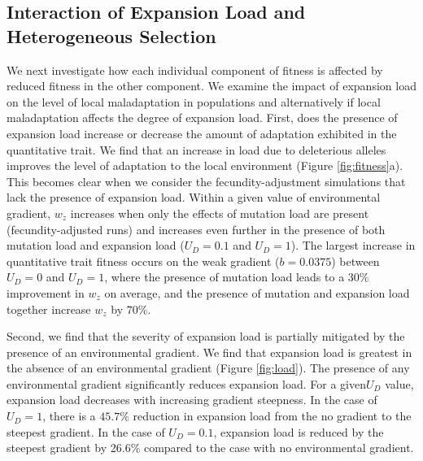 \subsection*{Interaction of Expansion Load and Heterogeneous Selection}
We next investigate how each individual component of fitness is affected by reduced fitness in the other component. We examine the impact of expansion load on the level of local maladaptation in populations and alternatively if local maladaptation affects the degree of expansion load. First, does the presence of expansion load increase or decrease the amount of adaptation exhibited in the quantitative trait. We find that an increase in load due to deleterious alleles improves the level of adaptation to the local environment (Figure \ref{fig:fitness}a). This becomes clear when we consider the fecundity-adjustment simulations that lack the presence of expansion load. Within a given value of environmental gradient, $w_z$ increases when only the effects of mutation load are present (fecundity-adjusted runs) and increases even further in the presence of both mutation load and expansion load  ($U_D = 0.1$ and $U_D = 1$). The largest increase in quantitative trait fitness occurs on the weak gradient ($b = 0.0375$) between $U_D = 0$ and $U_D = 1$, where the presence of mutation load leads to a $30\%$ improvement in $w_z$ on average, and the presence of mutation and expansion load together increase $w_z$ by $70\%$. 

Second, we find that the severity of expansion load is partially mitigated by the presence of an environmental gradient. We find that expansion load is greatest in the absence of an environmental gradient (Figure \ref{fig:load}). The presence of any environmental gradient significantly reduces expansion load. For a given$U_D$ value, expansion load decreases with increasing gradient steepness. In the case of $U_D = 1$, there is a $45.7\%$ reduction in expansion load from the no gradient to the steepest gradient. In the case of $U_D = 0.1$, expansion load is reduced by the steepest gradient by 26.6\% compared to the case with no environmental gradient. 


